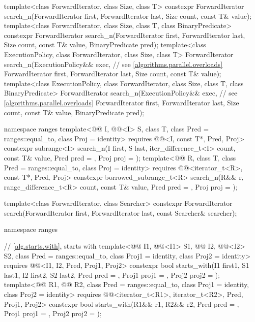 \begin{codeblock}
{  template<class ForwardIterator, class Size, class T>
    constexpr ForwardIterator
      search_n(ForwardIterator first, ForwardIterator last,
               Size count, const T& value);
  template<class ForwardIterator, class Size, class T, class BinaryPredicate>
    constexpr ForwardIterator
      search_n(ForwardIterator first, ForwardIterator last,
               Size count, const T& value, BinaryPredicate pred);
  template<class ExecutionPolicy, class ForwardIterator, class Size, class T>
    ForwardIterator
      search_n(ExecutionPolicy&& exec,                          // see \ref{algorithms.parallel.overloads}
               ForwardIterator first, ForwardIterator last,
               Size count, const T& value);
  template<class ExecutionPolicy, class ForwardIterator, class Size, class T,
           class BinaryPredicate>
    ForwardIterator
      search_n(ExecutionPolicy&& exec,                          // see \ref{algorithms.parallel.overloads}
               ForwardIterator first, ForwardIterator last,
               Size count, const T& value,
               BinaryPredicate pred);

  namespace ranges {
    template<@@ I, @@<I> S, class T,
             class Pred = ranges::equal_to, class Proj = identity>
      requires @@<I, const T*, Pred, Proj>
      constexpr subrange<I>
        search_n(I first, S last, iter_difference_t<I> count,
                 const T& value, Pred pred = {}, Proj proj = {});
    template<@@ R, class T, class Pred = ranges::equal_to,
             class Proj = identity>
      requires @@<iterator_t<R>, const T*, Pred, Proj>
      constexpr borrowed_subrange_t<R>
        search_n(R&& r, range_difference_t<R> count,
                 const T& value, Pred pred = {}, Proj proj = {});
  }

  template<class ForwardIterator, class Searcher>
    constexpr ForwardIterator
      search(ForwardIterator first, ForwardIterator last, const Searcher& searcher);

  namespace ranges {
    // \ref{alg.starts.with}, starts with
    template<@@ I1, @@<I1> S1, @@ I2, @@<I2> S2,
             class Pred = ranges::equal_to, class Proj1 = identity, class Proj2 = identity>
      requires @@<I1, I2, Pred, Proj1, Proj2>
      constexpr bool starts_with(I1 first1, S1 last1, I2 first2, S2 last2, Pred pred = {},
                                 Proj1 proj1 = {}, Proj2 proj2 = {});
    template<@@ R1, @@ R2, class Pred = ranges::equal_to,
             class Proj1 = identity, class Proj2 = identity>
      requires @@<iterator_t<R1>, iterator_t<R2>, Pred, Proj1, Proj2>
      constexpr bool starts_with(R1&& r1, R2&& r2, Pred pred = {},
                                 Proj1 proj1 = {}, Proj2 proj2 = {});

}}
\end{codeblock}
